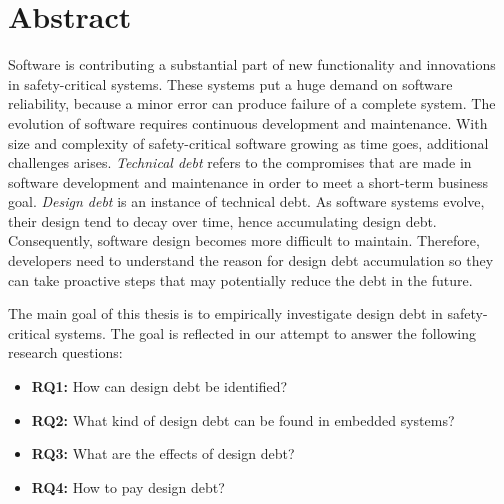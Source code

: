 


\section*{\Huge Abstract}
Software is contributing a substantial part of new functionality and innovations in safety-critical systems. These systems put a huge demand on software reliability, because a minor error can produce failure of a complete system. The evolution of software requires continuous development and maintenance. With size and complexity of safety-critical software growing as time goes, additional challenges arises. \textit{Technical debt} refers to the compromises that are made in software development and maintenance in order to meet a short-term business goal. \textit{Design debt} is an instance of technical debt. As software systems evolve, their design tend to decay over time, hence accumulating design debt. Consequently, software design becomes more difficult to maintain. Therefore, developers need to understand the reason for design debt accumulation so they can take proactive steps that may potentially reduce the debt in the future.

The main goal of this thesis is to empirically investigate design debt in safety-critical systems. The goal is reflected in our attempt to answer the following research questions:
\begin{itemize}
\item \textbf{RQ1:} How can design debt be identified?
\item \textbf{RQ2:} What kind of design debt can be found in embedded systems?
\item \textbf{RQ3:} What are the effects of design debt?
\item \textbf{RQ4:} How to pay design debt? 
\end{itemize}

